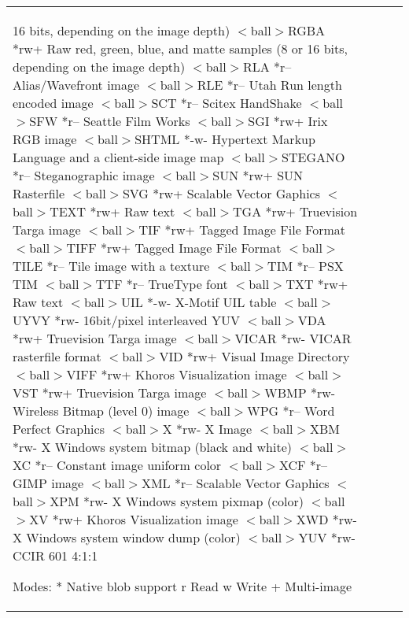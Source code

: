 \begin{longtable}{llll}
		16 bits, depending on the image depth)
$<$ball$>$RGBA	*rw+	Raw red, green, blue, and matte samples
		(8 or 16 bits, depending on the image
		depth)
$<$ball$>$RLA	*r--	Alias/Wavefront image
$<$ball$>$RLE	*r--	Utah Run length encoded image
$<$ball$>$SCT	*r--	Scitex HandShake
$<$ball$>$SFW	*r--	Seattle Film Works
$<$ball$>$SGI	*rw+	Irix RGB image
$<$ball$>$SHTML	*-w-	Hypertext Markup Language and a client-side
		image map
$<$ball$>$STEGANO	*r--	Steganographic image
$<$ball$>$SUN	*rw+	SUN Rasterfile
$<$ball$>$SVG	*rw+	Scalable Vector Gaphics
$<$ball$>$TEXT	*rw+	Raw text
$<$ball$>$TGA	*rw+	Truevision Targa image
$<$ball$>$TIF	*rw+	Tagged Image File Format
$<$ball$>$TIFF	*rw+	Tagged Image File Format
$<$ball$>$TILE	*r--	Tile image with a texture
$<$ball$>$TIM	*r--	PSX TIM
$<$ball$>$TTF	*r--	TrueType font
$<$ball$>$TXT	*rw+	Raw text
$<$ball$>$UIL	*-w-	X-Motif UIL table
$<$ball$>$UYVY	*rw-	16bit/pixel interleaved YUV
$<$ball$>$VDA	*rw+	Truevision Targa image
$<$ball$>$VICAR	*rw-	VICAR rasterfile format
$<$ball$>$VID	*rw+	Visual Image Directory
$<$ball$>$VIFF	*rw+	Khoros Visualization image
$<$ball$>$VST	*rw+	Truevision Targa image
$<$ball$>$WBMP	*rw-	Wireless Bitmap (level 0) image
$<$ball$>$WPG	*r--	Word Perfect Graphics
$<$ball$>$X	*rw-	X Image
$<$ball$>$XBM	*rw-	X Windows system bitmap (black and white)
$<$ball$>$XC	*r--	Constant image uniform color
$<$ball$>$XCF	*r--	GIMP image
$<$ball$>$XML	*r--	Scalable Vector Gaphics
$<$ball$>$XPM	*rw-	X Windows system pixmap (color)
$<$ball$>$XV	*rw+	Khoros Visualization image
$<$ball$>$XWD	*rw-	X Windows system window dump (color)
$<$ball$>$YUV	*rw-	CCIR 601 4:1:1
		
Modes:		
	*	Native blob support
	r	Read
	w	Write
	+	Multi-image

\end{longtable}
